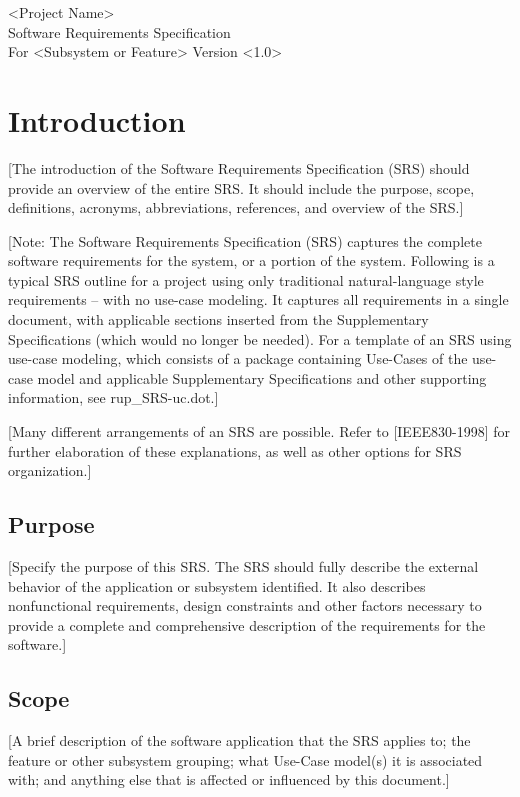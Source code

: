\documentclass[a4paper,12pt,chapterprefix=false,bibliography=totoc,listof=totoc]{scrreprt}
\begin{document}
\begin{flushright}
<Project Name>
\\
Software Requirements Specification
\\
For <Subsystem or Feature>
\bigbreak
Version <1.0>
\end{flushright}
\begin{versionhistory}
\end{versionhistory}

\chapter{Introduction}
[The introduction of the Software Requirements Specification (SRS) should provide an overview of the entire SRS. It should include the purpose, scope, definitions, acronyms, abbreviations, references, and overview of the SRS.]

[Note: The Software Requirements Specification (SRS) captures the complete software requirements for the system, or a portion of the system.  Following is a typical SRS outline for a project using only traditional natural-language style requirements – with no use-case modeling.  It captures all requirements in a single document,  with  applicable sections inserted from the  Supplementary Specifications (which would no longer be needed).  For a template of an SRS using use-case modeling, which consists of a package containing Use-Cases of the use-case model and applicable Supplementary Specifications and other supporting information, see rup\_SRS-uc.dot.]

[Many different arrangements of an SRS are possible.  Refer to [IEEE830-1998] for further elaboration of these explanations, as well as other options for SRS organization.]

\section{Purpose}
[Specify the purpose of this SRS. The SRS should fully describe the external behavior of the application or subsystem identified. It also describes nonfunctional requirements, design constraints and other factors necessary to provide a complete and comprehensive description of the requirements for the software.]

\section{Scope}
[A brief description of the software application that the SRS applies to; the feature or other subsystem grouping; what Use-Case model(s) it is associated with;  and anything else that is affected or influenced by this document.]
\end{document}
